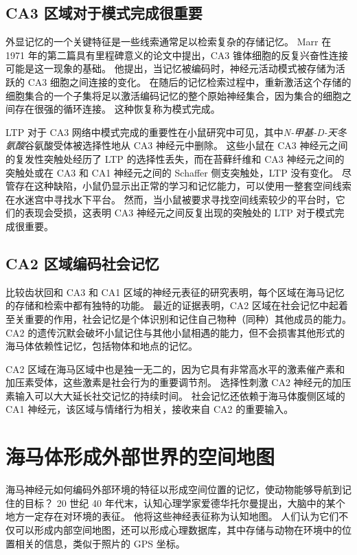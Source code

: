 \subsection{CA3 区域对于模式完成很重要}

外显记忆的一个关键特征是一些线索通常足以检索复杂的存储记忆。
Marr 在 1971 年的第二篇具有里程碑意义的论文中提出，CA3 锥体细胞的反复兴奋性连接可能是这一现象的基础。
他提出，当记忆被编码时，神经元活动模式被存储为活跃的 CA3 细胞之间连接的变化。
在随后的记忆检索过程中，重新激活这个存储的细胞集合的一个子集将足以激活编码记忆的整个原始神经集合，因为集合的细胞之间存在很强的循环连接。
这种恢复称为模式完成。


LTP 对于 CA3 网络中模式完成的重要性在小鼠研究中可见，其中\textit{N-甲基-D-天冬氨酸}谷氨酸受体被选择性地从 CA3 神经元中删除。
这些小鼠在 CA3 神经元之间的复发性突触处经历了 LTP 的选择性丢失，而在苔藓纤维和 CA3 神经元之间的突触处或在 CA3 和 CA1 神经元之间的 Schaffer 侧支突触处，LTP 没有变化。
尽管存在这种缺陷，小鼠仍显示出正常的学习和记忆能力，可以使用一整套空间线索在水迷宫中寻找水下平台。
然而，当小鼠被要求寻找空间线索较少的平台时，它们的表现会受损，这表明 CA3 神经元之间反复出现的突触处的 LTP 对于模式完成很重要。



\subsection{CA2 区域编码社会记忆}

比较齿状回和 CA3 和 CA1 区域的神经元表征的研究表明，每个区域在海马记忆的存储和检索中都有独特的功能。
最近的证据表明，CA2 区域在社会记忆中起着至关重要的作用，社会记忆是个体识别和记住自己物种（同种）其他成员的能力。
CA2 的遗传沉默会破坏小鼠记住与其他小鼠相遇的能力，但不会损害其他形式的海马体依赖性记忆，包括物体和地点的记忆。


CA2 区域在海马区域中也是独一无二的，因为它具有非常高水平的激素催产素和加压素受体，这些激素是社会行为的重要调节剂。
选择性刺激 CA2 神经元的加压素输入可以大大延长社交记忆的持续时间。
社会记忆还依赖于海马体腹侧区域的 CA1 神经元，该区域与情绪行为相关，接收来自 CA2 的重要输入。



\section{海马体形成外部世界的空间地图}

海马神经元如何编码外部环境的特征以形成空间位置的记忆，使动物能够导航到记住的目标？
20 世纪 40 年代末，认知心理学家爱德华托尔曼提出，大脑中的某个地方一定存在对环境的表征。
他将这些神经表征称为认知地图。
人们认为它们不仅可以形成内部空间地图，还可以形成心理数据库，其中存储与动物在环境中的位置相关的信息，类似于照片的 GPS 坐标。


